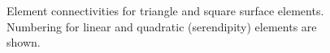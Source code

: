 \documentclass[11pt]{article}
\begin{document}
\begin{figure}[h!p]
\centering
     \hspace{0.4in}
      \hspace{0.4in}
     \caption{Element connectivities for triangle and square surface
     elements. Numbering for linear and quadratic (serendipity) elements are
     shown.}
     \label{el_num}
\end{figure}
\end{document}
